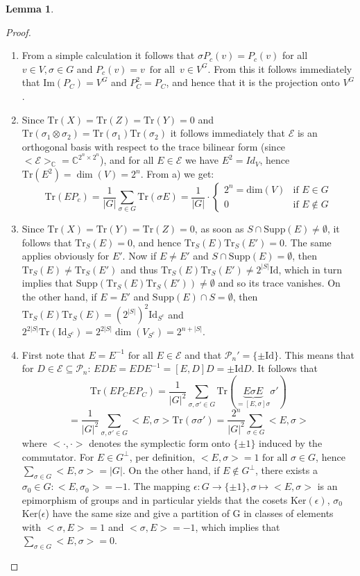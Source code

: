 \documentclass{article}
\def\P{\mathcal{P}}
\def\C{\mathbb{C}}
\def\supp{\text{Supp}}
\def\fa{\text{ for all }}
\def\Tr{\text{Tr}}
\def\Id{\text{Id}}
\newenvironment{bew}{\begin{proof}[Proof]}{\end{proof}}
\theoremstyle{definition}
\newtheorem{lem}[Satz]{Lemma}
\begin{document}
\begin{lem}
\begin{bew}
\begin{enumerate}
\item From a simple calculation it follows that $\sigma P_c(v) = P_c(v)$ for all $v \in V, \sigma \in G$ and $P_c(v) = v \, \fa \, v \in V^G$. From this it follows immediately that Im$(P_C) = V^G$ and $P_C^2 = P_C$, and hence that it is the projection onto $V^G$.
\item Since $\Tr(X) = \Tr(Z) = \Tr(Y) = 0$ and $\Tr(\sigma_1 \otimes \sigma_2) = \Tr(\sigma_1)\Tr(\sigma_2)$ it follows immediately that $\mathcal{E}$ is an orthogonal basis with respect to the trace bilinear form (since $<\mathcal{E}>_\C = \C^{2^n \times 2^n}$), and for all $E \in \mathcal{E}$ we have $E^2 = Id_V$, hence $\Tr(E^2) = \dim(V) = 2^n$.
From a) we get: \begin{equation} \Tr( E P_c) = \frac{1}{|G|} \sum_{\sigma \in G} \Tr(\sigma E) = \frac{1}{|G|} \cdot \left\{ \begin{array}{lr} 2^n = \text{dim}(V) & \text{if } E \in G \\ 0 & \text{if } E \notin G \end{array} \right. \end{equation}
\item Since $\Tr(X) = \Tr(Y) = \Tr(Z) = 0$, as soon as $S \cap \supp(E) \neq \emptyset$, it follows that $\Tr_S(E) = 0$, and hence $\Tr_S(E)\Tr_S(E') = 0$. The same applies obviously for $E'$. Now if $E \neq E'$ and $S \cap \supp(E) = \emptyset$, then $\Tr_S(E) \neq \Tr_S(E')$ and thus $\Tr_S(E)\Tr_S(E') \neq 2^{|S|} \Id $, which in turn implies that $\supp(\Tr_S(E)\Tr_S(E')) \neq \emptyset$ and so its trace vanishes.
On the other hand, if $E = E'$ and $\supp(E) \cap S = \emptyset$, then $\Tr_S(E)\Tr_S(E) = (2^{|S|})^2 \Id_{S^c}$ and $2^{2|S|} \Tr(\Id_{S^c}) = 2^{2|S|} \dim(V_{S^c}) = 2^{n + |S|}$.
\item First note that $E = E^{-1} \fa E \in \mathcal{E}$ and that $\P_n' = \{\pm \Id \}$. This means that for $D \in \mathcal{E} \subseteq \P_n $: $EDE = EDE^{-1} = [E,D]D = \pm \Id D$. It follows that
\begin{equation} \Tr(E P_C E P_C) = \frac{1}{|G|^2} \sum_{\sigma, \sigma' \in G} \Tr( \underbrace{E \sigma E}_{ = [E,\sigma]\sigma} \sigma') \end{equation}
\begin{equation} = \frac{1}{|G|^2} \sum_{\sigma, \sigma' \in G} <E,\sigma> \Tr( \sigma \sigma') =  \frac{2^n}{|G|^2} \sum_{\sigma \in G} <E,\sigma> \end{equation} where $< \cdot, \cdot >$ denotes the symplectic form onto $\{ \pm 1 \}$ induced by the commutator.
For $E \in G^\perp$, per definition, $<E,\sigma> = 1 \fa \sigma \in G$, hence $\sum_{\sigma \in G} <E,\sigma> = |G|$. On the other hand, if $E \notin G^\perp$, there exists a $\sigma_0 \in G: <E, \sigma_0> = -1$. The mapping $\epsilon: G \rightarrow \{ \pm 1 \}, \sigma \mapsto <E,\sigma>$ is an epimorphism of groups and 
in particular yields that the cosets Ker$(\epsilon)$, $\sigma_0$ Ker($\epsilon$) have the same size and give a partition of G in classes of elements with $<\sigma,E> = 1$ and $<\sigma,E> = -1$, which implies that $\sum_{\sigma \in G} <E,\sigma> = 0$.


\end{enumerate}
\end{bew}
\end{lem}
\end{document}
